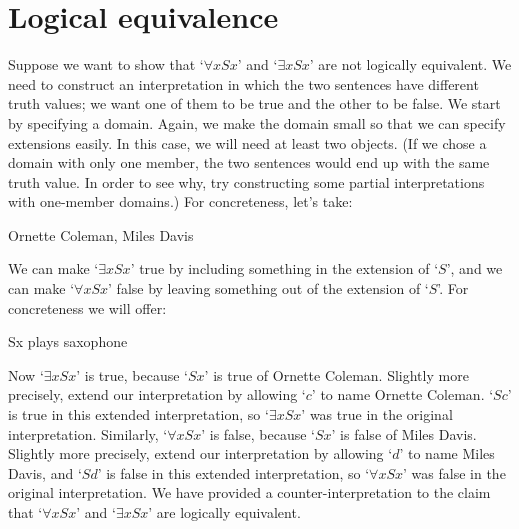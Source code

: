 \section{Logical equivalence}
Suppose we want to show that `$\forall x Sx$' and `$\exists x Sx$' are not logically equivalent. We need to construct an interpretation in which the two sentences have different truth values; we want one of them to be true and the other to be false. We start by specifying a domain. Again, we make the domain small so that we can specify extensions easily. In this case, we will need at least two objects. (If we chose a domain with only one member, the two sentences would end up with the same truth value. In order to see why, try constructing some partial interpretations with one-member domains.) For concreteness, let's take:
	\begin{ekey}
		\item[\text{domain}] Ornette Coleman, Miles Davis
	\end{ekey}
We can make `$\exists x Sx$' true by including something in the extension of `$S$', and we can make `$\forall x Sx$' false by leaving something out of the extension of `$S$'. For concreteness we will offer:
	\begin{ekey}
		\item[Sx]  plays saxophone
	\end{ekey}
Now `$\exists x Sx$' is true, because `$Sx$' is true of Ornette Coleman. Slightly more precisely, extend our interpretation by allowing `$c$' to name Ornette Coleman.  `$Sc$' is true in this extended interpretation, so `$\exists x Sx$' was true in the original interpretation. Similarly, `$\forall x Sx$' is false, because `$Sx$' is false of Miles Davis. Slightly more precisely, extend our interpretation by allowing `$d$' to name Miles Davis, and `$Sd$' is false in this extended interpretation, so `$\forall x Sx$' was false in the original interpretation. We have provided a counter-interpretation to the claim that `$\forall x Sx$' and `$\exists x Sx$' are logically equivalent.

